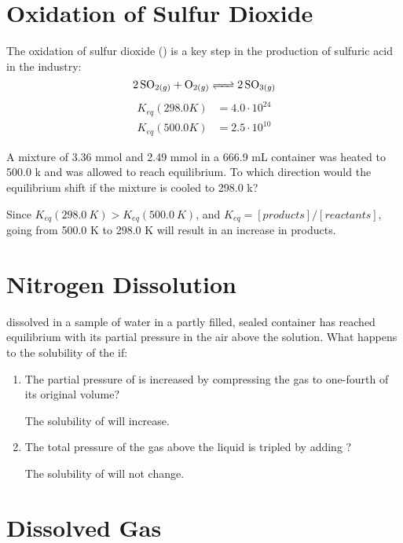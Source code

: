 \documentclass{article}
\begin{document}
\section{Oxidation of Sulfur Dioxide}

The oxidation of sulfur dioxide () is a key step in the production of sulfuric acid in the industry:
$$\ce{2SO_{2(g)} + O_{2(g)} <=> 2SO_{3(g)}}$$
\begin{align*}
    K_{eq}(298.0 \si{K})&=4.0\cdot10^{24}\\
    K_{eq}(500.0 \si{K})&=2.5\cdot10^{10}
\end{align*}

A mixture of 3.36 \si{mmol}  and 2.49 \si{mmol}  in a 666.9 \si{mL} container was heated to 500.0 \si{k} and was allowed to reach equilibrium. To which direction would the equilibrium shift if the mixture is cooled to 298.0 \si{k}?

Since $K_{eq}(298.0\ \si{K}) > K_{eq}(500.0\ \si{K})$, and $K_{eq}=[products]/[reactants]$, going from 500.0 \si{K} to 298.0 \si{K} will result in an increase in products.

\section{Nitrogen Dissolution}

 dissolved in a sample of water in a partly filled, sealed container has reached equilibrium with its partial pressure in the air above the solution. What happens to the solubility of the  if:

\begin{enumerate}
    \item The partial pressure of  is increased by compressing the gas to one-fourth of its original volume?
    
    The solubility of  will increase.
    
    \item The total pressure of the gas above the liquid is tripled by adding ?
    
    The solubility of  will not change.
    
\end{enumerate}

\section{Dissolved Gas}
\end{document}
